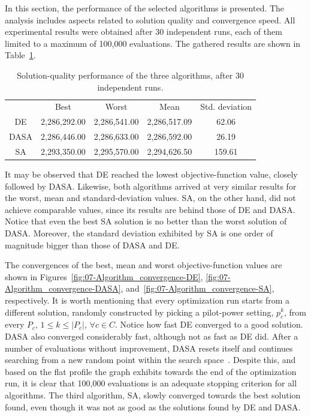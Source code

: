 In this section, the performance of the selected algorithms is presented.
The analysis includes aspects related to solution quality and convergence
speed. All experimental results were obtained after 30 independent
runs, each of them limited to a maximum of 100,000 evaluations. The
gathered results are shown in Table~\ref{tab:07-Algorithm_performance}.

\begin{table}
\centering

\caption{Solution-quality performance of the three algorithms, after 30 independent
runs\textit{\emph{.}}\textit{\label{tab:07-Algorithm_performance}}}


\begin{tabular}{ccccc}
\cmidrule{2-5} 
 & Best & Worst & Mean & Std. deviation\tabularnewline\addlinespace
\midrule
DE & 2,286,292.00 & 2,286,541.00 & 2,286,517.09 & 62.06\tabularnewline
DASA & 2,286,446.00 & 2,286,633.00 & 2,286,592.00 & 26.19\tabularnewline
SA  & 2,293,350.00 & 2,295,570.00 & 2,294,626.50 & 159.61\tabularnewline
\bottomrule
\end{tabular}
\end{table}


It may be observed that DE reached the lowest objective-function value,
closely followed by DASA. Likewise, both algorithms arrived at very
similar results for the worst, mean and standard-deviation values.
SA, on the other hand, did not achieve comparable values, since its
results are behind those of DE and DASA. Notice that even the best
SA solution is no better than the worst solution of DASA. Moreover,
the standard deviation exhibited by SA is one order of magnitude bigger
than those of DASA and DE.

The convergences of the best, mean and worst objective-function values
are shown in Figures~\ref{fig:07-Algorithm_convergence-DE}, \ref{fig:07-Algorithm_convergence-DASA},
and~\ref{fig:07-Algorithm_convergence-SA}, respectively. It is worth
mentioning that every optimization run starts from a different solution,
randomly constructed by picking a pilot-power setting, $p_{c}^{k}$,
from every $P_{c}$, $1\le k\le|P_{c}|$, $\forall c\in C$. Notice
how fast DE converged to a good solution. DASA also converged considerably
fast, although not as fast as DE did. After a number of evaluations
without improvement, DASA resets itself and continues searching from
a new random point within the search space~\cite{korosec2010_DASA}.
Despite this, and based on the flat profile the graph exhibits towards
the end of the optimization run, it is clear that 100,000 evaluations
is an adequate stopping criterion for all algorithms. The third algorithm,
SA, slowly converged towards the best solution found, even though
it was not as good as the solutions found by DE and DASA.

